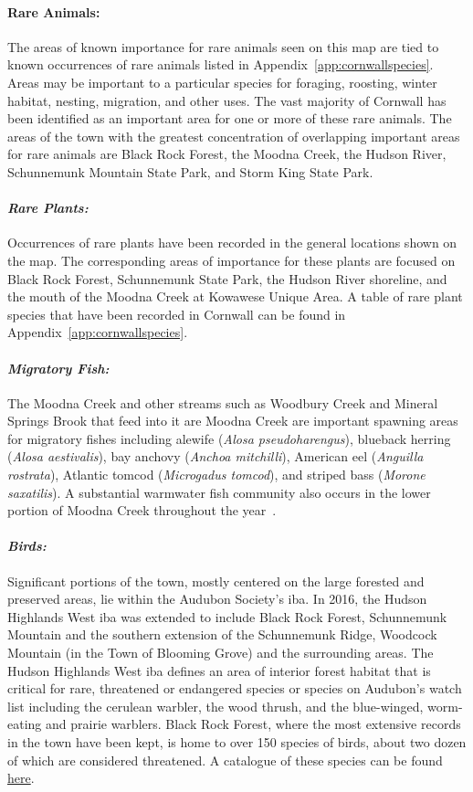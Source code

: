 \paragraph{Rare Animals:} The areas of known importance for rare animals seen
on this map are tied to known occurrences of rare animals listed in
Appendix~\ref{app:cornwallspecies}. Areas may be important to a particular
species for foraging, roosting, winter habitat, nesting, migration, and other
uses. The vast majority of Cornwall has been identified as an important area
for one or more of these rare animals. The areas of the town with the greatest
concentration of overlapping important areas for rare animals are Black Rock
Forest, the Moodna Creek, the Hudson River, Schunnemunk Mountain State Park,
and Storm King State Park.
\paragraph{\textit{Rare Plants:}} Occurrences of rare plants have been recorded 
in the general locations shown on the map. The corresponding areas of importance for
these plants are focused on Black Rock Forest, Schunnemunk State Park, the
Hudson River shoreline, and the mouth of the Moodna Creek at Kowawese Unique
Area. A table of rare plant species that have been recorded in Cornwall can be
found in Appendix~\ref{app:cornwallspecies}.
\paragraph{\textit{Migratory Fish:}} The Moodna Creek and other streams such as 
Woodbury Creek and Mineral Springs Brook that feed into it are Moodna Creek are 
important spawning areas for migratory fishes including alewife (\textit{Alosa 
pseudoharengus}), blueback herring (\textit{Alosa aestivalis}), bay anchovy 
(\textit{Anchoa mitchilli}), American eel (\textit{Anguilla rostrata}), 
Atlantic tomcod (\textit{Microgadus tomcod}), and striped bass (\textit{Morone 
saxatilis}). A substantial warmwater fish community also occurs in the lower 
portion of Moodna Creek throughout the year~\citep{nysdosmoodna}. 
\paragraph{\textit{Birds:}} Significant portions of the town, mostly centered 
on the large forested and preserved areas, lie within the Audubon Society's 
\gls{iba}. In 2016, the Hudson Highlands West \gls{iba} was extended to include 
Black Rock Forest, Schunnemunk Mountain and the southern extension of the 
Schunnemunk Ridge, Woodcock Mountain (in the Town of Blooming Grove) and the 
surrounding areas. The Hudson Highlands West \gls{iba} defines an area of 
interior forest habitat that is critical for rare, threatened or endangered 
species or species on Audubon's watch list including the cerulean warbler, the 
wood thrush, and the blue-winged, worm-eating and prairie warblers. Black Rock 
Forest, where the most extensive records in the town have been kept, is home to 
over 150 species of birds, about two dozen of which are considered threatened. 
A catalogue of these species can be found 
\href{http://blackrockforest.org/files/blackrock/content/brf\_bird\_checklist\_current
\_for\_web\_0.pdf}{here}. 
